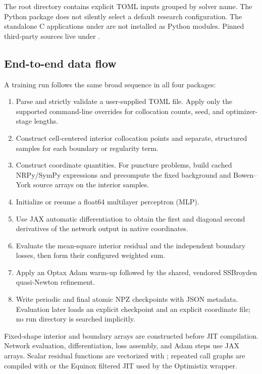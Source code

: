 \documentclass[11pt]{article}
\newcommand{\code}[1]{\texttt{\detokenize{#1}}}
\begin{document}
The root  directory contains explicit TOML inputs grouped by
solver name.  The Python package does not silently select a default research
configuration.  The standalone C applications under
 are not installed as Python modules.
Pinned third-party sources live under .

\subsection{End-to-end data flow}

A training run follows the same broad sequence in all four packages:

\begin{enumerate}
  \item Parse and strictly validate a user-supplied TOML file.  Apply only the
        supported command-line overrides for collocation counts, seed, and
        optimizer-stage lengths.
  \item Construct cell-centered interior collocation points and separate,
        structured samples for each boundary or regularity term.
  \item Construct coordinate quantities.  For puncture problems, build cached
        NRPy/SymPy expressions and precompute the fixed background and
        Bowen--York source arrays on the interior samples.
  \item Initialize or resume a float64 multilayer perceptron (MLP).
  \item Use JAX automatic differentiation to obtain the first and diagonal
        second derivatives of the network output in native coordinates.
  \item Evaluate the mean-square interior residual and the independent
        boundary losses, then form their configured weighted sum.
  \item Apply an Optax Adam warm-up followed by the shared, vendored
        SSBroyden quasi-Newton refinement.
  \item Write periodic and final atomic NPZ checkpoints with JSON metadata.
        Evaluation later loads an explicit checkpoint and an explicit
        coordinate file; no run directory is searched implicitly.
\end{enumerate}

Fixed-shape interior and boundary arrays are constructed before JIT
compilation.  Network evaluation, differentiation, loss assembly, and Adam
steps use JAX arrays.  Scalar residual functions are vectorized with
\code{jax.vmap}; repeated call graphs are compiled with \code{jax.jit} or the
Equinox filtered JIT used by the Optimistix wrapper.
\end{document}
